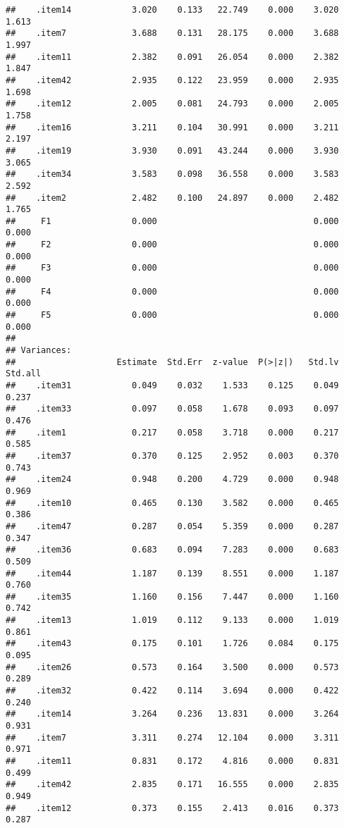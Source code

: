 \documentclass[
  english,
  man]{apa6}
\begin{document}
\begin{verbatim}
##    .item14            3.020    0.133   22.749    0.000    3.020    1.613
##    .item7             3.688    0.131   28.175    0.000    3.688    1.997
##    .item11            2.382    0.091   26.054    0.000    2.382    1.847
##    .item42            2.935    0.122   23.959    0.000    2.935    1.698
##    .item12            2.005    0.081   24.793    0.000    2.005    1.758
##    .item16            3.211    0.104   30.991    0.000    3.211    2.197
##    .item19            3.930    0.091   43.244    0.000    3.930    3.065
##    .item34            3.583    0.098   36.558    0.000    3.583    2.592
##    .item2             2.482    0.100   24.897    0.000    2.482    1.765
##     F1                0.000                               0.000    0.000
##     F2                0.000                               0.000    0.000
##     F3                0.000                               0.000    0.000
##     F4                0.000                               0.000    0.000
##     F5                0.000                               0.000    0.000
## 
## Variances:
##                    Estimate  Std.Err  z-value  P(>|z|)   Std.lv  Std.all
##    .item31            0.049    0.032    1.533    0.125    0.049    0.237
##    .item33            0.097    0.058    1.678    0.093    0.097    0.476
##    .item1             0.217    0.058    3.718    0.000    0.217    0.585
##    .item37            0.370    0.125    2.952    0.003    0.370    0.743
##    .item24            0.948    0.200    4.729    0.000    0.948    0.969
##    .item10            0.465    0.130    3.582    0.000    0.465    0.386
##    .item47            0.287    0.054    5.359    0.000    0.287    0.347
##    .item36            0.683    0.094    7.283    0.000    0.683    0.509
##    .item44            1.187    0.139    8.551    0.000    1.187    0.760
##    .item35            1.160    0.156    7.447    0.000    1.160    0.742
##    .item13            1.019    0.112    9.133    0.000    1.019    0.861
##    .item43            0.175    0.101    1.726    0.084    0.175    0.095
##    .item26            0.573    0.164    3.500    0.000    0.573    0.289
##    .item32            0.422    0.114    3.694    0.000    0.422    0.240
##    .item14            3.264    0.236   13.831    0.000    3.264    0.931
##    .item7             3.311    0.274   12.104    0.000    3.311    0.971
##    .item11            0.831    0.172    4.816    0.000    0.831    0.499
##    .item42            2.835    0.171   16.555    0.000    2.835    0.949
##    .item12            0.373    0.155    2.413    0.016    0.373    0.287

\end{verbatim}
\end{document}
